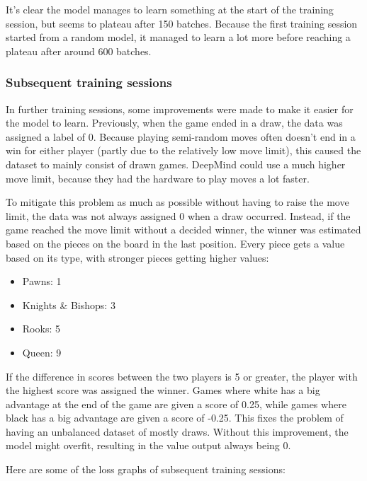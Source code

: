 \documentclass{article}
\begin{document}
It's clear the model manages to learn something at the start of the training session,
but seems to plateau after 150 batches. Because the first training session started from 
a random model, it managed to learn a lot more before reaching a plateau after around 600 batches.

\subsubsection{Subsequent training sessions}

In further training sessions, some improvements were made to make it easier for the model to learn.
Previously, when the game ended in a draw, the data was assigned a label of 0. 
Because playing semi-random moves often doesn't end in a win for either player 
(partly due to the relatively low move limit), this caused the dataset to mainly consist of drawn games. 
DeepMind could use a much higher move limit, because they had the hardware to play moves a lot faster.

To mitigate this problem as much as possible without having to raise the move limit, 
the data was not always assigned 0 when a draw occurred. Instead, if the game reached the move limit
without a decided winner, the winner was estimated based on the pieces on the board in the last position. 
Every piece gets a value based on its type, with stronger pieces getting higher values:

\begin{itemize}
    \item Pawns: 1
    \item Knights \& Bishops: 3
    \item Rooks: 5
    \item Queen: 9
\end{itemize}

If the difference in scores between the two players is 5 or greater, the player with the highest 
score was assigned the winner. Games where white has a big advantage at the end of the game are 
given a score of 0.25, while games where black has a big advantage are given a score of -0.25.
This fixes the problem of having an unbalanced dataset of mostly draws.
Without this improvement, the model might overfit, resulting in the value output always being 0.

Here are some of the loss graphs of subsequent training sessions:
\end{document}
